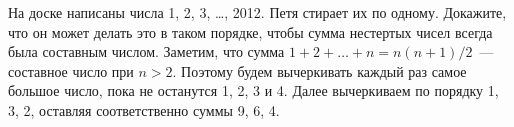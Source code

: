 \problem
На доске написаны числа 1, 2, 3, \ldots, 2012.
Петя стирает их по одному.
Докажите, что он может делать это в таком порядке, чтобы сумма нестертых чисел
всегда была составным числом.
\solution
Заметим, что сумма $1 + 2 + \ldots + n = n (n + 1) / 2$~--- составное число при
$n > 2$.
Поэтому будем вычеркивать каждый раз самое большое число, пока не останутся
1, 2, 3 и 4.
Далее вычеркиваем по порядку 1, 3, 2, оставляя соответственно суммы 9, 6, 4.
\endproblem
